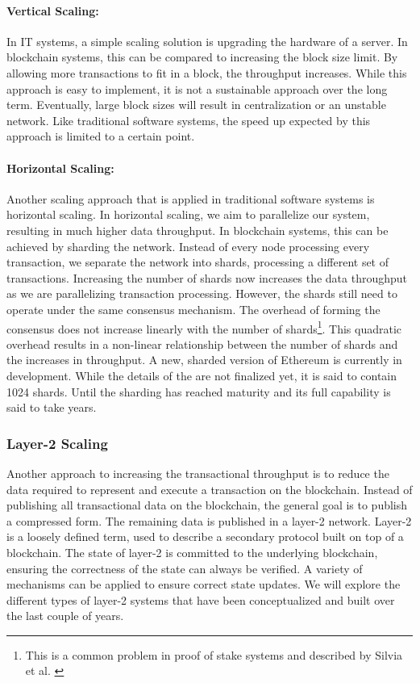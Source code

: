 \documentclass[../../thesis.tex]{subfiles}
\begin{document}
\paragraph{Vertical Scaling:}
In IT systems, a simple scaling solution is upgrading the hardware of a server. In blockchain systems, this can be compared to increasing the block size limit. By allowing more transactions to fit in a block, the throughput increases. While this approach is easy to implement, it is not a sustainable approach over the long term. Eventually, large block sizes will result in centralization or an unstable network.  Like traditional software systems, the speed up expected by this approach is limited to a certain point.

\paragraph{Horizontal Scaling:}
Another scaling approach that is applied in traditional software systems is horizontal scaling. In horizontal scaling, we aim to parallelize our system, resulting in much higher data throughput. In blockchain systems, this can be achieved by sharding the network. Instead of every node processing every transaction, we separate the network into shards, processing a different set of transactions. Increasing the number of shards now increases the data throughput as we are parallelizing transaction processing. However, the shards still need to operate under the same consensus mechanism. The overhead of forming the consensus does not increase linearly with the number of shards\footnote{This is a common problem in proof of stake systems and described by Silvia et al. \cite{silva2020comparison}}. This quadratic overhead results in a non-linear relationship between the number of shards and the increases in throughput. A new, sharded version of Ethereum is currently in development. While the details of the are not finalized yet, it is said to contain 1024 shards. Until the sharding has reached maturity and its full capability is said to take years.

\subsubsection{Layer-2 Scaling}
Another approach to increasing the transactional throughput is to reduce the data required to represent and execute a transaction on the blockchain. Instead of publishing all transactional data on the blockchain, the general goal is to publish a compressed form. The remaining data is published in a layer-2 network. Layer-2 is a loosely defined term, used to describe a secondary protocol built on top of a blockchain. The state of layer-2 is committed to the underlying blockchain, ensuring the correctness of the state can always be verified. A variety of mechanisms can be applied to ensure correct state updates. We will explore the different types of layer-2 systems that have been conceptualized and built over the last couple of years. 
\end{document}

